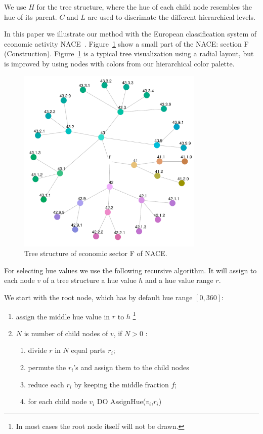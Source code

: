 \documentclass[review]{vgtc}                 %
\begin{document}
We use $H$ for the tree structure, where the hue of each child node resembles the hue of its parent. $C$ and $L$ are used to discrimate the different hierarchical levels.

In this paper we illustrate our method with the European classification system of economic activity NACE~\cite{nace}. Figure~\ref{fig:sbiF} show a small part of the NACE: section F (Construction). Figure~\ref{fig:sbiF} is a typical tree visualization using a radial layout, but is improved by using nodes with colors from our hierarchical color palette. 

\begin{figure}[htb]
  \centering
  \includegraphics[width=3.5in]{sbi_F.pdf}
  \caption{Tree structure of economic sector F of NACE.}\label{fig:sbiF}
\end{figure}

For selecting hue values we use the following recursive algorithm. It will assign to each node $v$ of a tree structure a hue value $h$ and a hue value range $r$.

We start with the root node, which has by default hue range $[0, 360]$:

\begin{enumerate} \itemsep1pt \parskip0pt 
\item assign the middle hue value in $r$ to $h$ \footnote{In most cases the root node itself will not be drawn.}
\item $N$ is number of child nodes of $v$, if $N>0$ :
\begin{enumerate}[i] \itemsep1pt \parskip0pt 
\item divide $r$ in $N$ equal parts $r_i$;
\item permute the $r_i$'s and assign them to the child nodes
\item reduce each $r_i$ by keeping the middle fraction $f$;
\item for each child node $v_i$ DO AssignHue($v_i$,$r_i$)
\end{enumerate}
\end{enumerate}
\end{document}
